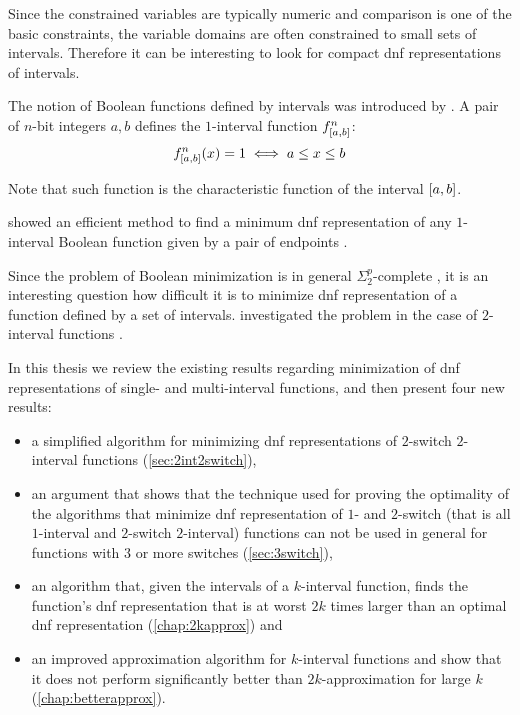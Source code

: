 Since the constrained variables are typically numeric
and comparison is one of the basic constraints,
the variable domains are often constrained
to small sets of intervals.
Therefore it can be interesting to look
for compact \acrshort{dnf}
representations of intervals.

The notion of
Boolean functions defined by intervals was introduced
by \citet{Schieber2005154}.
A pair of $n$-bit integers $a, b$
defines the $1$-interval function
$f^{n}_{[a, b]}$:
$$
f^{n}_{[a, b]} (x) = 1
\iff a \leq x \leq b
$$

Note that such function
is the characteristic function of the interval
$[a, b]$.

\citeauthor{Schieber2005154} showed an efficient method
to find a minimum \acrfull{dnf} representation
of any $1$-interval Boolean function
given by a pair of endpoints \citep{Schieber2005154}.

Since the problem of Boolean minimization is in general
$\Sigma_2^p$-complete \citep{Umans1998},
it is an interesting question how difficult it is
to minimize \acrshort{dnf} representation of
a function defined by a set of intervals.
\citeauthor{Dubovsky2012} investigated the problem
in the case of $2$-interval functions
\citep{Dubovsky2012}.

In this thesis we review the existing results regarding
minimization of \acrshort{dnf} representations of
single- and multi-interval functions,
and then present four new results:

\begin{itemize}
\item a simplified algorithm
for minimizing \acrshort{dnf} representations
of $2$-switch
$2$-interval functions (\cref{sec:2int2switch}),

\item
an argument that shows
that the technique used for proving the optimality
of the algorithms that minimize
\acrshort{dnf} representation
of $1$- and $2$-switch
(that is all $1$-interval
and $2$-switch $2$-interval)
functions
can not be used in general for
functions with $3$ or more switches
(\cref{sec:3switch}),

\item
an algorithm
that,
given the intervals of a $k$-interval function,
finds the function's \acrshort{dnf} representation
that is at worst
$2k$ times larger
than an optimal \acrshort{dnf} representation
(\cref{chap:2kapprox}) and

\item
an improved approximation algorithm
for $k$-interval functions
and show that it does not perform significantly
better than $2k$-approximation for large $k$
(\cref{chap:betterapprox}).
\end{itemize}
